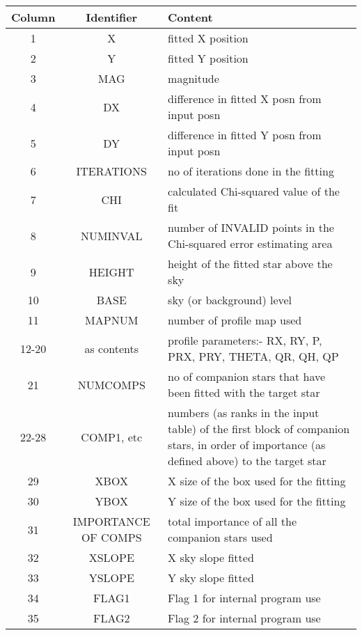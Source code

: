 \begin{small}
{{\begin{tabular}{|c|c|p{2.8in}|}\hline
   Column & Identifier &   Content \\ \hline
     1    &   X        &   fitted X position \\
     2    &   Y        &   fitted Y position  \\
     3    &   MAG      &   magnitude \\
     4    &   DX       &   difference in fitted X posn from input posn \\
     5    &   DY        &  difference in fitted Y posn from input posn \\
     6    &   ITERATIONS&  no of iterations done in the fitting \\
     7    &   CHI       &  calculated Chi-squared value of the fit \\
     8    &   NUMINVAL  &  number of INVALID points in the Chi-squared
                         error estimating area \\
     9    &   HEIGHT    &  height of the fitted star above the sky \\
    10    &   BASE      &  sky (or background) level \\
    11    &   MAPNUM    &  number of profile map used \\
    12-20 &   as contents & profile parameters:-  RX, RY, P, PRX, PRY, THETA,
        QR, QH, QP \\
    21    &   NUMCOMPS  &  no of companion stars that have been fitted with the
                         target star \\
    22-28 &   COMP1, etc & numbers (as ranks in the input table) of the
                         first block of companion stars, in order of
                         importance (as defined above) to the target star \\
    29    &   XBOX    &    X size of the box used for the fitting \\
    30    &   YBOX     &   Y size of the box used for the fitting \\
    31    &   IMPORTANCE OF COMPS & total importance of all the companion stars used \\
    32    &   XSLOPE    &  X sky slope fitted \\
    33    &   YSLOPE    &  Y sky slope fitted  \\
    34    &   FLAG1     &  Flag 1 for internal program use \\
    35    &   FLAG2     &  Flag 2 for internal program use \\

\end{tabular}}}
\end{small}
